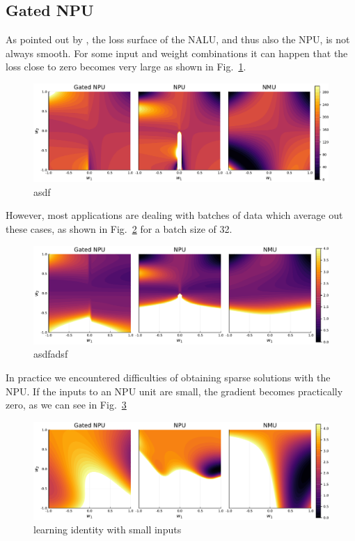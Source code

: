 \documentclass[9pt]{article}
\begin{document}
\subsection{Gated NPU}%
\label{sub:gated_npu}
As pointed out by \cite{madsen_neural_2020}, the loss surface of the NALU, and
thus also the NPU, is not always smooth. For some input and weight combinations
it can happen that the loss close to zero becomes very large as shown in
Fig.~\ref{fig:task_loss_npu_nmu}.
\begin{figure}
  \centering
  \includegraphics[width=0.8\linewidth]{task_loss_npu_nmu.pdf}
  \caption{asdf}%
  \label{fig:task_loss_npu_nmu}
\end{figure}
However, most applications are dealing with batches of data which average out
these cases, as shown in Fig.~\ref{fig:task_loss_npu_nmu_average} for a batch
size of 32.
\begin{figure}
  \centering
  \includegraphics[width=0.8\linewidth]{task_loss_npu_nmu_average.pdf}
  \caption{asdfadsf}%
  \label{fig:task_loss_npu_nmu_average}
\end{figure}

In practice we encountered difficulties of obtaining sparse solutions with the
NPU. If the inputs to an NPU unit are small, the gradient becomes practically
zero, as we can see in Fig.~\ref{fig:id_loss_npu_nmu}
\begin{figure}
  \centering
  \includegraphics[width=0.8\linewidth]{id_loss_npu_nmu.pdf}
  \caption{learning identity with small inputs}%
  \label{fig:id_loss_npu_nmu}
\end{figure}
\end{document}
